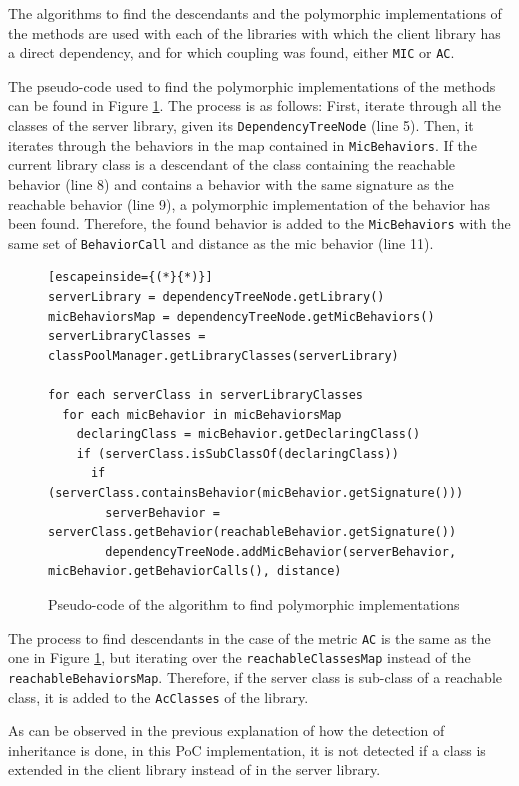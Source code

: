 The algorithms to find the descendants and the polymorphic implementations of the methods are used with each of the libraries with which the client library has a direct dependency, and for which coupling was found, either \texttt{MIC} or \texttt{AC}.

The pseudo-code used to find the polymorphic implementations of the methods can be found in Figure \ref{fig:algorithm-polymorphy}. The process is as follows: First, iterate through all the classes of the server library, given its \texttt{DependencyTreeNode} (line 5). Then, it iterates through the behaviors in the map contained in \texttt{MicBehaviors}. If the current library class is a descendant of the class containing the reachable behavior (line 8) and contains a behavior with the same signature as the reachable behavior (line 9), a polymorphic implementation of the behavior has been found. Therefore, the found behavior is added to the \texttt{MicBehaviors} with the same set of \texttt{BehaviorCall} and distance as the mic behavior (line 11).

\begin{figure}[ht!]
\begin{lstlisting}[escapeinside={(*}{*)}]
serverLibrary = dependencyTreeNode.getLibrary()
micBehaviorsMap = dependencyTreeNode.getMicBehaviors()
serverLibraryClasses = classPoolManager.getLibraryClasses(serverLibrary)

for each serverClass in serverLibraryClasses
  for each micBehavior in micBehaviorsMap
    declaringClass = micBehavior.getDeclaringClass()
    if (serverClass.isSubClassOf(declaringClass))
      if (serverClass.containsBehavior(micBehavior.getSignature()))
        serverBehavior = serverClass.getBehavior(reachableBehavior.getSignature())
        dependencyTreeNode.addMicBehavior(serverBehavior, micBehavior.getBehaviorCalls(), distance)
\end{lstlisting}
\caption{Pseudo-code of the algorithm to find polymorphic implementations}
\label{fig:algorithm-polymorphy}
\end{figure}

The process to find descendants in the case of the metric \texttt{AC} is the same as the one in Figure \ref{fig:algorithm-polymorphy}, but iterating over the \texttt{reachableClassesMap} instead of the \texttt{reachableBehaviorsMap}. Therefore, if the server class is sub-class of a reachable class, it is added to the \texttt{AcClasses} of the library.

\blankl
As can be observed in the previous explanation of how the detection of inheritance is done, in this PoC implementation, it is not detected if a class is extended in the client library instead of in the server library.

